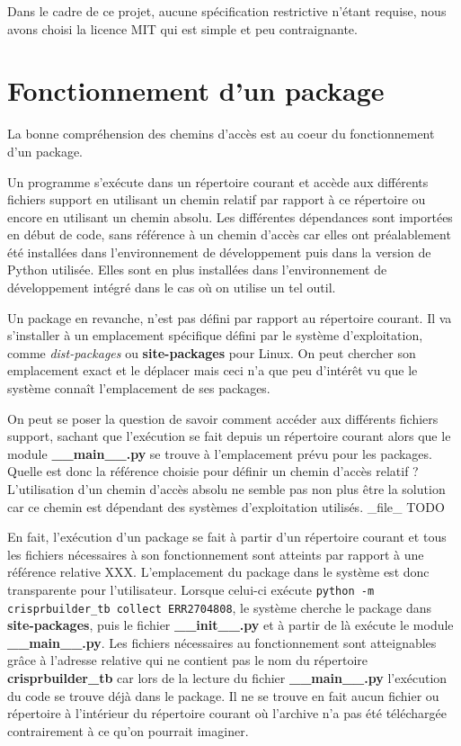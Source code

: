 \documentclass[twoside,a4paper,11pt,frenchb,openany]{report}
\begin{document}
Dans le cadre de ce projet, aucune spécification restrictive n'étant requise, nous avons choisi la licence MIT qui est simple et peu contraignante.




\section{Fonctionnement d'un package}

La bonne compréhension des chemins d'accès est au coeur du fonctionnement d'un package.

Un programme s'exécute dans un répertoire courant et accède aux différents fichiers support en utilisant un chemin relatif par rapport à ce répertoire ou encore en utilisant un chemin absolu. Les différentes dépendances sont importées en début de code, sans référence à un chemin d'accès car elles ont préalablement été installées dans l'environnement de développement puis dans la version de Python utilisée. Elles sont en plus installées dans l'environnement de développement intégré dans le cas où on utilise un tel outil.

Un package en revanche, n'est pas défini par rapport au répertoire courant. Il va s'installer à un emplacement spécifique défini par le système d'exploitation, comme \textit{dist-packages} ou \textbf{site-packages} pour Linux. On peut chercher son emplacement exact et  le déplacer mais ceci n'a que peu d'intérêt vu que le système connaît l'emplacement de ses packages.

On peut se poser la question de savoir comment accéder aux différents fichiers support, sachant que l'exécution se fait depuis un répertoire courant alors que le module \textbf{\_\_main\_\_.py} se trouve à l'emplacement prévu pour les packages. Quelle est donc la référence choisie pour définir un chemin d'accès relatif ? L'utilisation d'un chemin d'accès absolu ne semble pas non plus être la solution car ce chemin est dépendant des systèmes d'exploitation utilisés. \_file\_ TODO

En fait, l'exécution d'un package se fait à partir d'un répertoire courant et tous les fichiers nécessaires à son fonctionnement sont atteints par rapport à une référence relative XXX. L'emplacement du package dans le système est donc transparente pour l'utilisateur. Lorsque celui-ci exécute \texttt{python -m crisprbuilder\_tb \textemdash \textemdash collect ERR2704808}, le système cherche le package dans \textbf{site-packages}, puis le fichier \textbf{\_\_init\_\_.py} et à partir de là exécute le module \textbf{\_\_main\_\_.py}. Les fichiers nécessaires au fonctionnement sont atteignables grâce à l'adresse relative qui ne contient pas le nom du répertoire \textbf{crisprbuilder\_tb} car lors de la lecture du fichier \textbf{\_\_main\_\_.py} l'exécution du code se trouve déjà dans le package. Il ne se trouve en fait aucun fichier ou répertoire à l'intérieur du répertoire courant où l'archive n'a pas été téléchargée contrairement à ce qu'on pourrait imaginer.
\end{document}
